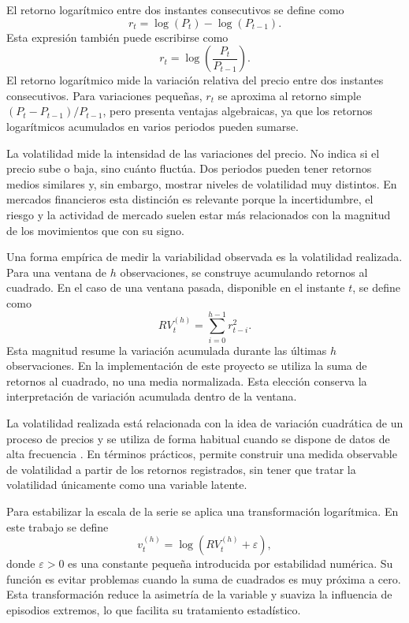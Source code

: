 El retorno logarítmico entre dos instantes consecutivos se define como
\begin{equation}
    r_t = \log(P_t)-\log(P_{t-1}).
\end{equation}
Esta expresión también puede escribirse como
\begin{equation}
    r_t = \log\left(\frac{P_t}{P_{t-1}}\right).
\end{equation}
El retorno logarítmico mide la variación relativa del precio entre dos instantes consecutivos. Para variaciones pequeñas, \(r_t\) se aproxima al retorno simple \((P_t-P_{t-1})/P_{t-1}\), pero presenta ventajas algebraicas, ya que los retornos logarítmicos acumulados en varios periodos pueden sumarse.

La volatilidad mide la intensidad de las variaciones del precio. No indica si el precio sube o baja, sino cuánto fluctúa. Dos periodos pueden tener retornos medios similares y, sin embargo, mostrar niveles de volatilidad muy distintos. En mercados financieros esta distinción es relevante porque la incertidumbre, el riesgo y la actividad de mercado suelen estar más relacionados con la magnitud de los movimientos que con su signo.

Una forma empírica de medir la variabilidad observada es la volatilidad realizada. Para una ventana de \(h\) observaciones, se construye acumulando retornos al cuadrado. En el caso de una ventana pasada, disponible en el instante \(t\), se define como
\begin{equation}
    RV_t^{(h)} = \sum_{i=0}^{h-1} r_{t-i}^{2}.
\end{equation}
Esta magnitud resume la variación acumulada durante las últimas \(h\) observaciones. En la implementación de este proyecto se utiliza la suma de retornos al cuadrado, no una media normalizada. Esta elección conserva la interpretación de variación acumulada dentro de la ventana.

La volatilidad realizada está relacionada con la idea de variación cuadrática de un proceso de precios y se utiliza de forma habitual cuando se dispone de datos de alta frecuencia \cite{barndorff2002,andersen2003}. En términos prácticos, permite construir una medida observable de volatilidad a partir de los retornos registrados, sin tener que tratar la volatilidad únicamente como una variable latente.

Para estabilizar la escala de la serie se aplica una transformación logarítmica. En este trabajo se define
\begin{equation}
    v_t^{(h)} = \log\left(RV_t^{(h)}+\varepsilon\right),
\end{equation}
donde \(\varepsilon>0\) es una constante pequeña introducida por estabilidad numérica. Su función es evitar problemas cuando la suma de cuadrados es muy próxima a cero. Esta transformación reduce la asimetría de la variable y suaviza la influencia de episodios extremos, lo que facilita su tratamiento estadístico.

